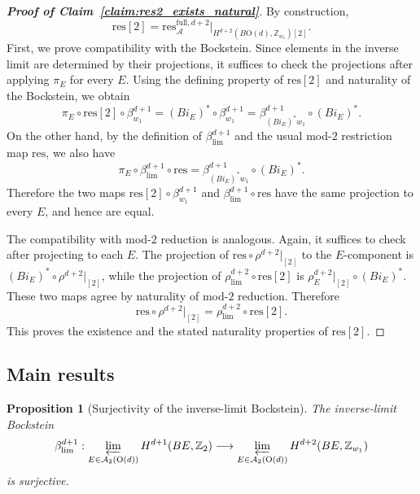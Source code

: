 \documentclass[aps,prx,reprint,superscriptaddress,twocolumn,amsmath,amssymb,amsfonts, nofootinbib]{revtex4-2}
\newcommand{\res}{\text{res}}
\newcommand{\Z}{\mathbb{Z}}
\theoremstyle{apsstyle}
\newtheorem{proposition}[theorem]{Proposition}
\begin{document}
\begin{proof}[\textnormal{\textbf{Proof of Claim~\ref{claim:res2_exists_natural}}}]
By construction, \begin{equation} \res[2] = \res_{\mathcal A}^{\mathrm{full},d+2} \big\vert_{H^{d+2}(B\mathrm{O}(d),\Z_{w_1})[2]}. \end{equation} 
First, we prove compatibility with the Bockstein. Since elements in the inverse limit are determined by their projections, it suffices to check the projections after applying $\pi_E$ for every $E$. Using the defining property of $\res[2]$ and naturality of the Bockstein, we obtain
\begin{equation}
\pi_E\circ \res[2]\circ \beta^{d+1}_{w_1}
=
(Bi_E)^*\circ \beta^{d+1}_{w_1}
=
\beta^{d+1}_{(Bi_E)^*w_1}\circ (Bi_E)^*.
\end{equation}
On the other hand, by the definition of $\beta_{\lim}^{d+1}$ and the usual mod-$2$ restriction map $\res$, we also have
\begin{equation}
\pi_E\circ \beta_{\lim}^{d+1}\circ \res
=
\beta^{d+1}_{(Bi_E)^*w_1}\circ (Bi_E)^*.
\end{equation}
Therefore the two maps $\res[2]\circ \beta^{d+1}_{w_1}$ and $\beta_{\lim}^{d+1}\circ \res$ have the same projection to every $E$, and hence are equal.

\medskip

The compatibility with mod-$2$ reduction is analogous. Again, it suffices to check after projecting to each $E$. The projection of $\res\circ \rho^{d+2}\vert_{[2]}$ to the $E$-component is $(Bi_E)^*\circ \rho^{d+2}\vert_{[2]}$, while the projection of $\rho_{\lim}^{d+2}\circ \res[2]$ is $\rho^{d+2}_E\vert_{[2]}\circ (Bi_E)^*$. These two maps agree by naturality of mod-$2$ reduction. Therefore
\begin{equation}
\res\circ \rho^{d+2}\vert_{[2]}
=
\rho_{\lim}^{d+2}\circ \res[2].
\end{equation}
This proves the existence and the stated naturality properties of $\res[2]$.
\end{proof} 

\subsection{Main results}
\label{app:main_throerem_proof_main_results}

\begin{proposition}[Surjectivity of the inverse-limit Bockstein]
\label{prop:limit_bockstein_surjective}
The inverse-limit Bockstein
\[
\beta_{\lim}^{d+1}:
\varprojlim_{E\in\mathcal A_2(\mathrm{O}(d))} H^{d+1}(BE,\mathbb Z_2) \longrightarrow 
\varprojlim_{E\in\mathcal A_2(\mathrm{O}(d))} H^{d+2}(BE,\mathbb Z_{w_1})
\]
is surjective.
\end{proposition}
\end{document}
